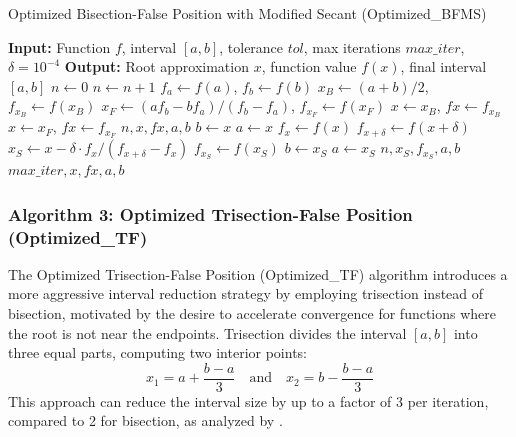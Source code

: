 \documentclass[amsmath, amssymb, aps]{revtex4-2}
\begin{document}
\begin{algorithm}[H]
\caption{Optimized Bisection-False Position with Modified Secant (Optimized\_BFMS)}
\begin{algorithmic}[1]
\State \textbf{Input:} Function $f$, interval $[a, b]$, tolerance $tol$, max iterations $max\_iter$, $\delta = 10^{-4}$
\State \textbf{Output:} Root approximation $x$, function value $f(x)$, final interval $[a, b]$
\State $n \gets 0$
    \State $n \gets n + 1$
    \State $f_a \gets f(a)$, $f_b \gets f(b)$
    \State $x_B \gets (a + b)/2$, $f_{x_B} \gets f(x_B)$
    \State $x_F \gets (a f_b - b f_a)/(f_b - f_a)$, $f_{x_F} \gets f(x_F)$
        \State $x \gets x_B$, $fx \gets f_{x_B}$
    \Else
        \State $x \gets x_F$, $fx \gets f_{x_F}$
    \EndIf
        \State \Return $n, x, fx, a, b$
    \EndIf
        \State $b \gets x$
    \Else
        \State $a \gets x$
    \EndIf
    \State $f_x \gets f(x)$
    \State $f_{x+\delta} \gets f(x + \delta)$
    \State $x_S \gets x - \delta \cdot f_x / (f_{x+\delta} - f_x)$
        \State $f_{x_S} \gets f(x_S)$
                \State $b \gets x_S$
            \Else
                \State $a \gets x_S$
            \EndIf
                \State \Return $n, x_S, f_{x_S}, a, b$
            \EndIf
        \EndIf
    \EndIf
\EndWhile
\State \Return $max\_iter, x, fx, a, b$
\end{algorithmic}
\end{algorithm}


\subsubsection{Algorithm 3: Optimized Trisection-False Position (Optimized\_TF)}

The Optimized Trisection-False Position (Optimized\_TF) algorithm introduces a more aggressive interval reduction strategy by employing trisection instead of bisection, motivated by the desire to accelerate convergence for functions where the root is not near the endpoints. Trisection divides the interval $[a, b]$ into three equal parts, computing two interior points:
\begin{equation}
x_1 = a + \frac{b - a}{3} \quad \text{and} \quad x_2 = b - \frac{b - a}{3}
\end{equation}
This approach can reduce the interval size by up to a factor of 3 per iteration, compared to 2 for bisection, as analyzed by \cite{demir2008trisection}.
\end{document}
